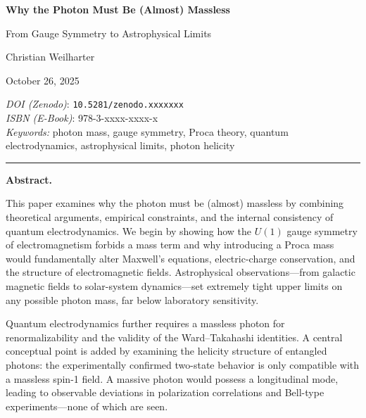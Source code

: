 \documentclass[12pt,oneside]{scrartcl}
\newcommand{\SeriesTitle}{Theoretical Physics – Derivations in Historical Context\par}
\newcommand{\PaperTitle}{\LARGE\textbf{Why the Photon Must Be (Almost) Massless}\\[0.4em]
	{\large From Gauge Symmetry to Astrophysical Limits\par}}
\newcommand{\PaperAuthor}{Christian Weilharter}
\newcommand{\PaperDate}{October 26, 2025}
\newcommand{\PaperDOI}{\emph{DOI (Zenodo)}: \texttt{10.5281/zenodo.xxxxxxx}}
\newcommand{\PaperISBNPDF}{\emph{ISBN (Print)}: 978-3-xxxx-xxxx-x}
\newcommand{\PaperISBNEPUB}{\emph{ISBN (E-Book)}: 978-3-xxxx-xxxx-x}
\newcommand{\PaperKeywords}{photon mass, gauge symmetry, Proca theory, quantum electrodynamics, astrophysical limits, photon helicity
}
\newcommand{\PaperMetadata}{
	\vspace{1em}
	\begin{flushleft}
		\small
		\setlength{\parskip}{3pt}
		\noindent\PaperDOI\\
		\PaperISBNEPUB\\
		\textit{Keywords:} \PaperKeywords
	\end{flushleft}
	\vspace{1em}
}
\begin{document}
	\thispagestyle{empty}
	
	\begin{titlepage}
	\begin{center}
		
	
		
		\vspace*{1.8cm}
		
			\PaperTitle 
	
		\vspace{0.6cm}
	
		
	
	    {\Large\PaperAuthor}
		\vspace{0.65cm}
		
		{\large\PaperDate}
		
		\vfill
	\end{center}
	
		{\small
		
		
		\noindent\PaperDOI\\
	\PaperISBNEPUB\\
	\textit{Keywords:} \PaperKeywords
		
		}
		
	\end{titlepage}
	
	
	\vspace{1em}
	\hrule
	\vspace{1em}
	
	\noindent\textbf{Abstract.}  
	
		This paper examines why the photon must be (almost) massless by combining 
		theoretical arguments, empirical constraints, and the internal consistency 
		of quantum electrodynamics. We begin by showing how the $U(1)$ gauge 
		symmetry of electromagnetism forbids a mass term and why introducing a 
		Proca mass would fundamentally alter Maxwell’s equations, electric-charge 
		conservation, and the structure of electromagnetic fields. Astrophysical 
		observations---from galactic magnetic fields to solar-system dynamics---set 
		extremely tight upper limits on any possible photon mass, far below 
		laboratory sensitivity.
		
		Quantum electrodynamics further requires a massless photon for 
		renormalizability and the validity of the Ward--Takahashi identities. 
		A central conceptual point is added by examining the helicity structure 
		of entangled photons: the experimentally confirmed two-state behavior 
		is only compatible with a massless spin-1 field. A massive photon would 
		possess a longitudinal mode, leading to observable deviations in 
		polarization correlations and Bell-type experiments---none of which are seen.
		
\end{document}
